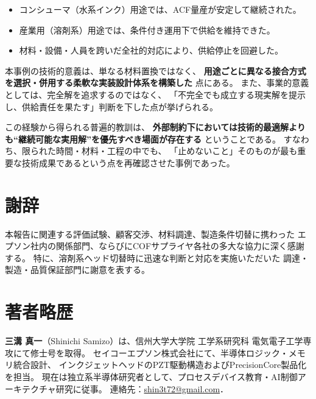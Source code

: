\documentclass[conference]{IEEEtran}
\begin{document}
\begin{itemize}
  \item コンシューマ（水系インク）用途では、ACF量産が安定して継続された。  
  \item 産業用（溶剤系）用途では、条件付き運用下で供給を維持できた。  
  \item 材料・設備・人員を跨いだ全社的対応により、供給停止を回避した。  
\end{itemize}

本事例の技術的意義は、単なる材料置換ではなく、  
\textbf{用途ごとに異なる接合方式を選択・併用する柔軟な実装設計体系を構築した}  
点にある。  
また、事業的意義としては、完全解を追求するのではなく、  
「不完全でも成立する現実解を提示し、供給責任を果たす」判断を下した点が挙げられる。  

この経験から得られる普遍的教訓は、  
\textbf{外部制約下においては技術的最適解よりも“継続可能な実用解”を優先すべき場面が存在する}  
ということである。  
すなわち、限られた時間・材料・工程の中でも、  
「止めないこと」そのものが最も重要な技術成果であるという点を再確認させた事例であった。

\section*{謝辞}

本報告に関連する評価試験、顧客交渉、材料調達、製造条件切替に携わった  
エプソン社内の関係部門、ならびにCOFサプライヤ各社の多大な協力に深く感謝する。  
特に、溶剤系ヘッド切替時に迅速な判断と対応を実施いただいた  
調達・製造・品質保証部門に謝意を表する。

\section*{著者略歴}

\textbf{三溝 真一}（Shinichi Samizo）は、信州大学大学院 工学系研究科 電気電子工学専攻にて修士号を取得。  
セイコーエプソン株式会社にて、半導体ロジック・メモリ統合設計、  
インクジェットヘッドのPZT駆動構造およびPrecisionCore製品化を担当。  
現在は独立系半導体研究者として、プロセスデバイス教育・AI制御アーキテクチャ研究に従事。  
連絡先：\href{mailto:shin3t72@gmail.com}{shin3t72@gmail.com}．

\balance %
\end{document}

